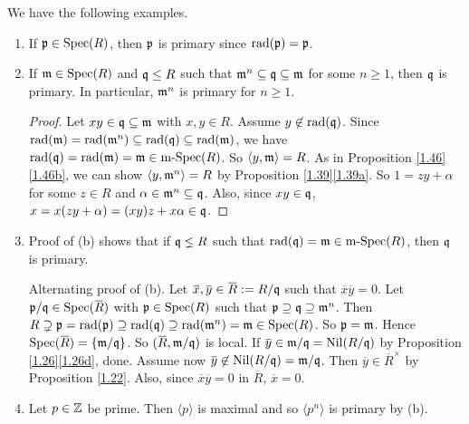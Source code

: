 \begin{example}\label{4.11}
    We have the following examples.
    \begin{enumerate}
        \item\label{4.11a}
            If $\mathfrak{p} \in \operatorname{Spec}(R)$, then $\mathfrak{p}$ is primary since $\operatorname{rad}(\mathfrak{p}) = \mathfrak{p}$.
        \item\label{4.11b}
            If $\mathfrak{m} \in \operatorname{Spec}(R)$ and $\mathfrak{q} \leq R$ such that $\mathfrak{m}^{n} \subseteq \mathfrak{q} \subseteq \mathfrak{m}$ for some $n \geq 1$, then $\mathfrak{q}$ is primary. In particular, $\mathfrak{m}^{n}$ is primary for $n \geq 1$.
            \begin{proof}
                Let $xy \in \mathfrak{q} \subseteq \mathfrak{m}$ with $x,y \in R$. Assume $y \not\in \operatorname{rad}(\mathfrak{q})$. Since $\operatorname{rad}(\mathfrak{m}) = \operatorname{rad}(\mathfrak{m}^{n}) \subseteq \operatorname{rad}(\mathfrak{q}) \subseteq \operatorname{rad}(\mathfrak{m})$, we have $\operatorname{rad}(\mathfrak{q}) = \operatorname{rad}(\mathfrak{m}) = \mathfrak{m} \in \operatorname{m-Spec}(R)$. So $\langle y,\mathfrak{m} \rangle = R$. As in Proposition \ref{1.46}\ref{1.46b}, we can show $\langle y,\mathfrak{m}^{n} \rangle = R$ by Proposition \ref{1.39}\ref{1.39a}. So $1 = zy + \alpha$ for some $z \in R$ and $\alpha \in \mathfrak{m}^{n} \subseteq \mathfrak{q}$. Also, since $xy \in \mathfrak{q}$, $x = x(zy+\alpha) = (xy)z+x\alpha \in \mathfrak{q}$. 
            \end{proof}
        \item\label{4.11c} 
            Proof of (b) shows that if $\mathfrak{q} \lneq R$ such that $\operatorname{rad}(\mathfrak{q}) = \mathfrak{m} \in \operatorname{m-Spec}(R)$, then $\mathfrak{q}$ is primary. \par 
            Alternating proof of (b). Let $\overbar{x},\overbar{y} \in \overbar{R}: = R/\ffq$ such that $\overbar{x} \overbar{y} = 0$. Let $\ffp/\ffq \in \operatorname{Spec}(\overbar{R})$ with $\mathfrak{p} \in \operatorname{Spec}(R)$ such that $\mathfrak{p} \supseteq \mathfrak{q} \supseteq \mathfrak{m}^{n}$. Then $R \supsetneq \mathfrak{p} = \operatorname{rad}(\mathfrak{p}) \supseteq \operatorname{rad}(\mathfrak{q}) \supseteq \operatorname{rad}(\mathfrak{m}^{n}) = \mathfrak{m} \in \operatorname{Spec}(R)$. So $\mathfrak{p} = \mathfrak{m}$. Hence $\operatorname{Spec}(\overbar{R}) = \{\ffm/\ffq\}$. So $(\overbar{R},\ffm/\ffq)$ is local. If $\overbar{y} \in \ffm/\ffq = \operatorname{Nil}(R/\ffq)$ by Proposition \ref{1.26}\ref{1.26d}, done. Assume now $\overbar{y} \not \in \operatorname{Nil}(R/\ffq) = \ffm/\ffq$. Then $\overbar{y} \in \overbar{R}^{\times}$ by Proposition \ref{1.22}. Also, since $\overbar{x} \overbar{y} = 0$ in $\overbar{R}$, $\overbar{x} = 0$.
        \item\label{4.11d} Let $p \in \mathbb{Z}$ be prime. Then $\langle p \rangle$ is maximal and so $\langle p^{n} \rangle$ is primary by (b).
    \end{enumerate}
\end{example}

